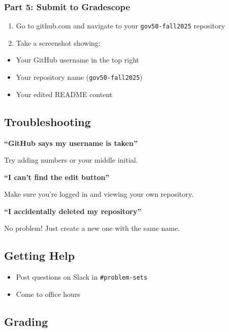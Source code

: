 \documentclass[
  11pt,
  letterpaper]{article}
\providecommand{\tightlist}{%
  \setlength{\itemsep}{0pt}\setlength{\parskip}{0pt}}
\begin{document}
\subsubsection{Part 5: Submit to
Gradescope}\label{part-5-submit-to-gradescope}

\begin{enumerate}
\def\labelenumi{\arabic{enumi}.}
\tightlist
\item
  Go to github.com and navigate to your \texttt{gov50-fall2025}
  repository
\item
  Take a screenshot showing:
\end{enumerate}

\begin{itemize}
\tightlist
\item
  Your GitHub username in the top right
\item
  Your repository name (\texttt{gov50-fall2025})
\item
  Your edited README content
\end{itemize}

\subsection{Troubleshooting}\label{troubleshooting}

\textbf{``GitHub says my username is taken''}

Try adding numbers or your middle initial.

\textbf{``I can't find the edit button''}

Make sure you're logged in and viewing your own repository.

\textbf{``I accidentally deleted my repository''}

No problem! Just create a new one with the same name.

\subsection{Getting Help}\label{getting-help}

\begin{itemize}
\tightlist
\item
  Post questions on Slack in \texttt{\#problem-sets}
\item
  Come to office hours
\end{itemize}

\subsection{Grading}\label{grading}
\end{document}
